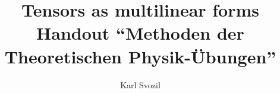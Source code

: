 \documentclass[prl,preprint,showpacs,showkeys,amsfonts]{revtex4}
\usepackage{graphicx}
 \RequirePackage{times}
\RequirePackage{mathptm}






\title{Tensors as  multilinear forms\\
Handout ``Methoden der Theoretischen Physik-\"Ubungen''}
\author{Karl Svozil}

\begin{abstract}
Tensors are defined as multilinear forms on vector spaces
\end{abstract}



\maketitle


\section{Notation}

Consider the vector space ${\Bbb R}^D$ of dimension $D$,
a basis
${\mathfrak B}=\{{\bf e}_1,{\bf e}_2,\ldots ,{\bf e}_D\}$ consisting of
$D$ basis vectors ${\bf e}_i$,
and $n$ arbitrary vectors
$x_1,x_2,\ldots ,x_n^D$
with vector components
$X^i_1,X^i_2,\ldots ,X^i_n$.

{\em Tensor fields} define tensors in every point of ${\Bbb R}^D$ separately.
In general, with respect to a particular basis, the components of a tensor field
depend on the coordinates.


We adopt Einstein's summation convention to sum over equal indices
(one pair with a superscript and a subscript).
Sometimes, sums are written out explicitly.


